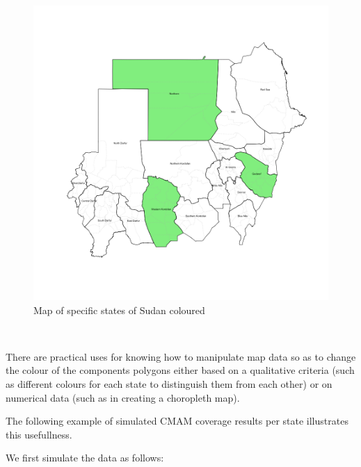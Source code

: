\documentclass[12pt,a4paper,a4paper]{book}
\theoremstyle{definition}
\theoremstyle{definition}
\theoremstyle{definition}
\theoremstyle{remark}
\begin{document}
\begin{figure}[H]

{\centering \includegraphics{figures/map10-1} 

}

\caption{Map of specific states of Sudan coloured}\label{fig:map10}
\end{figure}

~

There are practical uses for knowing how to manipulate map data so as to
change the colour of the components polygons either based on a
qualitative criteria (such as different colours for each state to
distinguish them from each other) or on numerical data (such as in
creating a choropleth map).

The following example of simulated CMAM coverage results per state
illustrates this usefullness.

We first simulate the data as follows:

~
\end{document}
